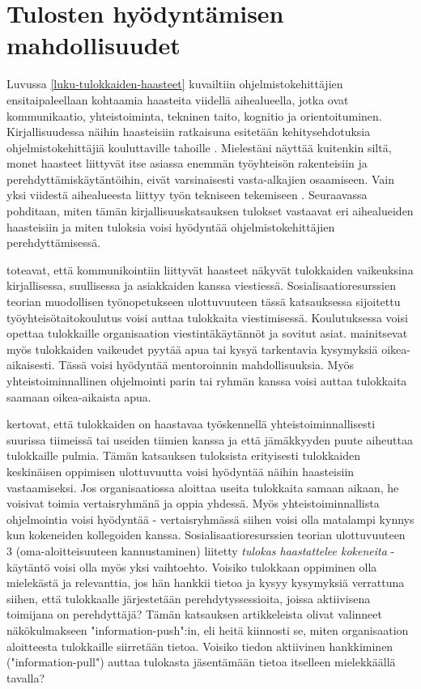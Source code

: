 \documentclass[utf8]{gradu3}
\begin{document}
\section{Tulosten hyödyntämisen mahdollisuudet}

Luvussa \ref{luku-tulokkaiden-haasteet} kuvailtiin ohjelmistokehittäjien ensitaipaleellaan kohtaamia haasteita viidellä aihealueella, jotka ovat kommunikaatio, yhteistoiminta, tekninen taito, kognitio ja orientoituminen. Kirjallisuudessa näihin haasteisiin ratkaisuna esitetään kehitysehdotuksia ohjelmistokehittäjiä kouluttaville tahoille %
\parencites%
    {radermacher-ym-2015}%
    {begel-simon-2008}%
    {begel-simon-2008-all-over-again}%
    {garousi-ym-2020}%
    {kulkarni-ym-2010}%
\relax.
%
Mielestäni näyttää kuitenkin siltä, monet haasteet liittyvät itse asiassa enemmän työyhteisön rakenteisiin ja perehdyttämiskäytäntöihin, eivät varsinaisesti vasta-alkajien osaamiseen. Vain yksi viidestä aihealueesta liittyy työn tekniseen tekemiseen \parencite{begel-simon-2008}. Seuraavassa pohditaan, miten tämän kirjallisuuskatsauksen tulokset vastaavat eri aihealueiden haasteisiin ja miten tuloksia voisi hyödyntää ohjelmistokehittäjien perehdyttämisessä.

\textcite{begel-simon-2008} toteavat, että kommunikointiin liittyvät haasteet näkyvät tulokkaiden vaikeuksina kirjallisessa, suullisessa ja asiakkaiden kanssa viestiessä. Sosialisaatioresurssien teorian muodollisen työnopetukseen ulottuvuuteen tässä katsauksessa sijoitettu työyhteisötaitokoulutus voisi auttaa tulokkaita viestimisessä. Koulutuksessa voisi opettaa tulokkaille organisaation viestintäkäytännöt ja sovitut asiat. \textcite{begel-simon-2008} mainitsevat myös tulokkaiden vaikeudet pyytää apua tai kysyä tarkentavia kysymyksiä oikea-aikaisesti. Tässä voisi hyödyntää mentoroinnin mahdollisuuksia. Myös yhteistoiminnallinen ohjelmointi parin tai ryhmän kanssa voisi auttaa tulokkaita saamaan oikea-aikaista apua.

\textcite{begel-simon-2008} kertovat, että tulokkaiden on haastavaa työskennellä yhteistoiminnallisesti suurissa tiimeissä tai useiden tiimien kanssa ja että jämäkkyyden puute aiheuttaa tulokkaille pulmia. Tämän katsauksen tuloksista erityisesti tulokkaiden keskinäisen oppimisen ulottuvuutta voisi hyödyntää näihin haasteisiin vastaamiseksi. Jos organisaatiossa aloittaa useita tulokkaita samaan aikaan, he voisivat toimia vertaisryhmänä ja oppia yhdessä. Myös yhteistoiminnallista ohjelmointia voisi hyödyntää - vertaisryhmässä siihen voisi olla matalampi kynnys kun kokeneiden kollegoiden kanssa. Sosialisaatioresurssien teorian ulottuvuuteen 3 (oma-aloitteisuuteen kannustaminen) liitetty \textit{tulokas haastattelee kokeneita} -käytäntö voisi olla myös yksi vaihtoehto. Voisiko tulokkaan oppiminen olla mielekästä ja relevanttia, jos hän hankkii tietoa ja kysyy kysymyksiä verrattuna siihen, että tulokkaalle järjestetään perehdytyssessioita, joissa aktiivisena toimijana on perehdyttäjä? Tämän katsauksen artikkeleista \textcite{yates-ym-2020} olivat valinneet näkökulmakseen "information-push":in, eli heitä kiinnosti se, miten organisaation aloitteesta tulokkaille siirretään tietoa. Voisiko tiedon aktiivinen hankkiminen ("information-pull") auttaa tulokasta jäsentämään tietoa itselleen mielekkäällä tavalla?
\end{document}
